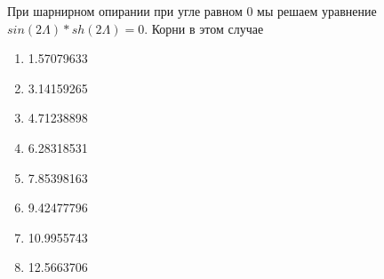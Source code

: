 \documentclass{article}
\begin{document}
При шарнирном опирании при угле равном $0$ мы решаем уравнение $sin(2\Lambda)*sh(2\Lambda)=0$. Корни в этом случае 
\begin{enumerate}
    \item 1.57079633
    \item 3.14159265
    \item 4.71238898
    \item 6.28318531
    \item 7.85398163
    \item 9.42477796
    \item 10.9955743
    \item 12.5663706
\end{enumerate}
\end{document}
